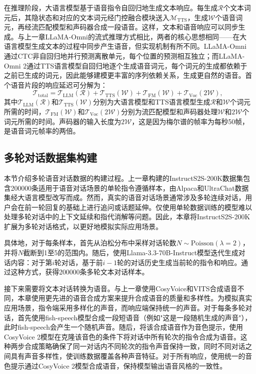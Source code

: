 在推理阶段，大语言模型基于语音指令自回归地生成文本响应。每生成$\mathcal{R}$个文本词元后，其隐状态和对应的文本词元经门控融合模块送入$\mathcal{M}_\text{TTS}$，生成$\mathcal{W}$个语音词元，再经流匹配模型和声码器合成一段语音。这样，文本和语音响应可以同步生成。与上一章LLaMA-Omni的流式推理方式相比，两者的核心思想相同——在大语言模型生成文本的过程中同步产生语音，但实现机制有所不同。LLaMA-Omni通过CTC非自回归地并行预测离散单元，每个位置的预测相互独立；而LLaMA-Omni 2通过TTS语言模型自回归地逐个生成语音词元，每个词元的生成都依赖于之前已生成的词元，因此能够建模更丰富的序列依赖关系，生成更自然的语音。首个语音片段的响应延迟可分解为：
\begin{equation}
    \mathcal{T}_\text{total} = \mathcal{T}_\text{LLM}(\mathcal{R}) + \mathcal{T}_\text{TTS}(\mathcal{W}) + \mathcal{T}_\text{FM}(\mathcal{W}) + \mathcal{T}_\text{Voc}(2\mathcal{W}),
    \label{eq:llamaomni2_latency}
\end{equation}
其中$\mathcal{T}_\text{LLM}(\mathcal{R})$和$\mathcal{T}_\text{TTS}(\mathcal{W})$分别为大语言模型和TTS语言模型生成$\mathcal{R}$和$\mathcal{W}$个词元所需的时间，$\mathcal{T}_\text{FM}(\mathcal{W})$和$\mathcal{T}_\text{Voc}(2\mathcal{W})$分别为流匹配模型和声码器处理$\mathcal{W}$和$2\mathcal{W}$个词元所需的时间。声码器的输入长度为$2\mathcal{W}$，这是因为梅尔谱的帧率为每秒50帧，是语音词元帧率的两倍。


\subsection{多轮对话数据集构建}

本节介绍多轮语音对话数据的构建过程。上一章构建的InstructS2S-200K数据集包含200000条适用于语音对话场景的单轮指令遵循样本，由Alpaca\citep{alpaca}和UltraChat\citep{ultrachat}数据集经大语言模型改写而成。然而，真实的语音对话场景通常涉及多轮连续对话，用户会在前一轮回复的基础上进行追问或话题延伸。仅使用单轮数据训练的模型难以处理多轮对话中的上下文延续和指代消解等问题。因此，本章将InstructS2S-200K扩展为多轮对话格式，以更好地模拟实际应用场景。

具体地，对于每条样本，首先从泊松分布中采样对话轮数$N \sim \text{Poisson}(\lambda=2)$，并将$N$截断到1至5的范围内。随后，使用Llama-3.3-70B-Instruct\citep{dubey2024llama3}模型迭代生成对话内容：对于第$i$轮对话，基于前$i-1$轮的对话历史生成当前轮的指令和响应。通过这种方式，获得200000条多轮文本对话样本。

接下来需要将文本对话转换为语音。与上一章使用CosyVoice和VITS合成语音不同，本章使用更先进的语音合成方案来提升合成语音的质量和多样性。为模拟真实应用场景，指令端采用多样化的声音，而响应端保持统一的声音。对于每条多轮对话，首先使用fish-speech\citep{fish-speech-v1.4}模型合成一段短语音（例如"这是一段随机生成的声音"），此时fish-speech会产生一个随机声音。随后，将该合成语音作为音色提示，使用CosyVoice 2模型在克隆该音色的条件下将对话中所有轮次的指令合成为语音。这种两步合成策略确保了同一对话内不同轮次的指令声音保持一致，同时不同对话之间具有声音多样性，使训练数据覆盖各种声音特征。对于所有响应，使用统一的音色提示通过CosyVoice 2模型合成语音，保持模型输出语音风格的一致性。


